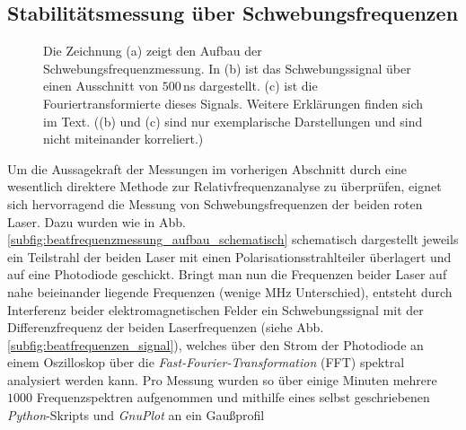 \subsection{Stabilitätsmessung über
Schwebungsfrequenzen}\label{subsec:beatfrequenzmessung}
\begin{figure}[hp]
 	\centering
 	\footnotesize
	\caption[Beatfrequenzmessung]{Die Zeichnung (a) zeigt den Aufbau der
	Schwebungsfrequenzmessung. In (b) ist das Schwebungssignal über einen
	Ausschnitt von $500\,$ns dargestellt. (c) ist die Fouriertransformierte dieses
	Signals. Weitere Erklärungen finden sich im Text. ((b) und (c) sind nur
	exemplarische Darstellungen und sind nicht miteinander korreliert.)}
	\label{fig:beatfrequenzmessung}
\end{figure}
Um die Aussagekraft der Messungen im vorherigen Abschnitt durch eine wesentlich
direktere Methode zur Relativfrequenzanalyse zu überprüfen, eignet sich hervorragend die
Messung von Schwebungsfrequenzen der beiden roten Laser. Dazu wurden wie in Abb.
\ref{subfig:beatfrequenzmessung_aufbau_schematisch} schematisch dargestellt
jeweils ein Teilstrahl der beiden Laser mit einen Polarisationsstrahlteiler
überlagert und auf eine Photodiode geschickt. Bringt man nun die Frequenzen
beider Laser auf nahe beieinander liegende Frequenzen (wenige MHz
Unterschied), entsteht durch Interferenz beider
elektromagnetischen Felder ein Schwebungssignal mit der Differenzfrequenz der
beiden Laserfrequenzen (siehe Abb. \ref{subfig:beatfrequenzen_signal}), welches
über den Strom der Photodiode an einem Oszilloskop über die \textit{Fast-Fourier-Transformation} (FFT)
spektral analysiert werden kann. Pro Messung wurden so über einige Minuten
mehrere $1000$ Frequenzspektren aufgenommen und mithilfe eines selbst
geschriebenen \textit{Python}-Skripts und \textit{GnuPlot} an ein Gaußprofil
